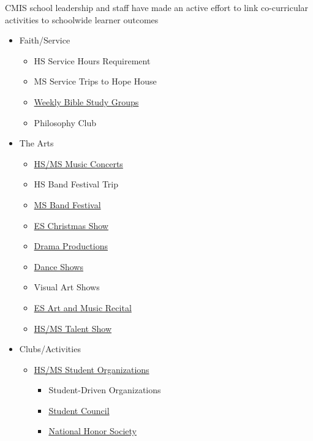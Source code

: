 \begin{findings}

CMIS school leadership and staff have made an active effort to link co-curricular activities to schoolwide learner outcomes
\begin{itemize}
\item Faith/Service
\begin{itemize}
\item  HS Service Hours Requirement
\item  MS Service Trips to Hope House
\item  \href{http://blogs.cmis.ac.th/eagles/faith-service/spiritual-life/}{Weekly Bible Study Groups}
\item  Philosophy Club
\end{itemize}
\item The Arts
\begin{itemize}
\item  \href{https://www.youtube.com/watch?v=x4ScCitmSXU&t=3646s}{HS/MS Music Concerts}
\item  HS Band Festival Trip
\item  \href{https://www.youtube.com/watch?v=_S2R2jLdJOU}{MS Band Festival}
\item  \href{http://gallery.cmis.ac.th/2016-2017/Elementary-Christmas-Concert/}{ES Christmas Show}
\item  \href{http://blogs.cmis.ac.th/newsletter/2016/11/15/upcoming-drama-event-the-best-christmas-pageant-ever/}{Drama Productions}
\item  \href{http://gallery.cmis.ac.th/2016-2017/dance_show/}{Dance Shows}
\item  Visual Art Shows
\item  \href{http://blogs.cmis.ac.th/newsletter/2016/03/15/cmis-art-and-music-show-march-17/}{ES Art and Music Recital}
\item  \href{https://www.youtube.com/watch?v=yG677dWZqpw}{HS/MS Talent Show}
\end{itemize}
\item  Clubs/Activities
\begin{itemize}
\item  \href{http://blogs.cmis.ac.th/eagles/clubs-activities/ms-hs/}{HS/MS Student Organizations}
\begin{itemize}
\item Student-Driven Organizations
\item \href{http://blogs.cmis.ac.th/eagles/clubs-activities/ms-hs/stuco/}{Student Council}
\item \href{http://blogs.cmis.ac.th/newsletter/2016/11/04/cmis-proud-to-be-a-member-school-of-the-national-honor-society/}{National Honor Society}

\end{itemize}
\end{itemize}
\end{itemize}
\end{findings}
